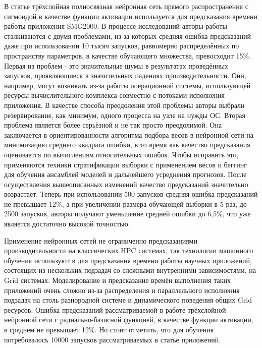 		В статье \cite{ML_SMG2000} трёхслойная полносвязная нейронная сеть прямого распространения с сигмоидой в качестве функции активации используется для предсказания времени работы приложения SMG2000. В процессе исследований авторы работы сталкиваются с двумя проблемами, из-за которых средняя ошибка предсказаний даже при использовании 10 тысяч запусков, равномерно распределённых по пространству параметров, в качестве обучающего множества, превосходит 15\%. Первая из проблем - это значительные шумы в результатах проведённых запусков, проявляющиеся в значительных падениях производительности. Они, например, могут возникать из-за работы операционной системы, использующей ресурсы вычислительного комплекса совместно с потоками исполнения приложения. В качестве способа преодоления этой проблемы авторы выбрали резервирование, как минимум, одного процесса на узле на нужды ОС. Вторая проблема является более серьёзной и не так просто преодолимой. Она заключается в ориентированности алгоритма подбора весов в нейронной сети на минимизацию среднего квадрата ошибки, в то время как качество предсказания оценивается по вычислениям относительных ошибок. Чтобы исправить это, применяются техники стратификации выборки с применением весов и беггинг для обучения ансамблей моделей и дальнейшего усреднения прогнозов. После осуществления вышеописанных изменений качество предсказаний значительно возрастает. Теперь при использовании 500 запусков средняя ошибка предсказаний не превышает 12\%, а при увеличении размера обучающей выборки в 5 раз, до 2500 запусков, авторы получают уменьшение средней ошибки до 6,5\%, что уже является достаточно высокой точностью.

		Применение нейронных сетей не ограниченно предсказаниями производительности на классических HPC системах, так технологии машинного обучения используют в \cite{ML_Grid} для предсказания времени работы научных приложений, состоящих из нескольких подзадач со сложными внутренними зависимостями, на Grid системах. Моделирование и предсказание времён выполнения таких приложений очень сложно из-за распределения и параллельного исполнения подзадач на столь разнородной системе и динамического поведения общих Grid ресурсов. Ошибка предсказаний рассматриваемой в работе трёхслойной нейронной сети с радиально-базисной функцией, в качестве функции активации, в среднем не превышает 12\%. Но стоит отметить, что для обучения потребовалось 10000 запусков рассматриваемых в статье приложений.

